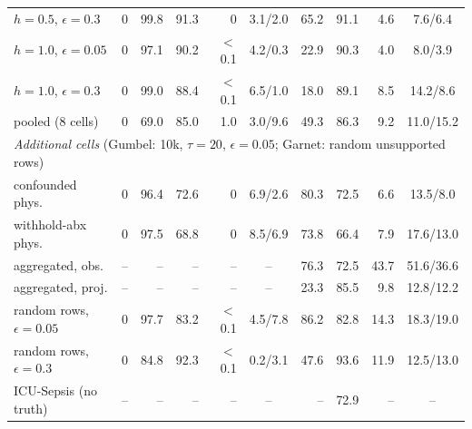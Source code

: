 \begin{tabular}{lrrrrcrrrc}
$h{=}0.5$, $\epsilon{=}0.3$ & 0 & 99.8 & 91.3 & 0 & 3.1/2.0 & 65.2 & 91.1 & 4.6 & 7.6/6.4 \\
$h{=}1.0$, $\epsilon{=}0.05$ & 0 & 97.1 & 90.2 & $<$0.1 & 4.2/0.3 & 22.9 & 90.3 & 4.0 & 8.0/3.9 \\
$h{=}1.0$, $\epsilon{=}0.3$ & 0 & 99.0 & 88.4 & $<$0.1 & 6.5/1.0 & 18.0 & 89.1 & 8.5 & 14.2/8.6 \\
pooled (8 cells) & 0 & 69.0 & 85.0 & 1.0 & 3.0/9.6 & 49.3 & 86.3 & 9.2 & 11.0/15.2 \\
\midrule
\multicolumn{10}{l}{\textit{Additional cells} (Gumbel: 10k, $\tau{=}20$, $\epsilon{=}0.05$; Garnet: random unsupported rows)} \\
confounded phys. & 0 & 96.4 & 72.6 & 0 & 6.9/2.6 & 80.3 & 72.5 & 6.6 & 13.5/8.0 \\
withhold-abx phys. & 0 & 97.5 & 68.8 & 0 & 8.5/6.9 & 73.8 & 66.4 & 7.9 & 17.6/13.0 \\
aggregated, obs. & -- & -- & -- & -- & -- & 76.3 & 72.5 & 43.7 & 51.6/36.6 \\
aggregated, proj. & -- & -- & -- & -- & -- & 23.3 & 85.5 & 9.8 & 12.8/12.2 \\
random rows, $\epsilon{=}0.05$ & 0 & 97.7 & 83.2 & $<$0.1 & 4.5/7.8 & 86.2 & 82.8 & 14.3 & 18.3/19.0 \\
random rows, $\epsilon{=}0.3$ & 0 & 84.8 & 92.3 & $<$0.1 & 0.2/3.1 & 47.6 & 93.6 & 11.9 & 12.5/13.0 \\
\midrule
ICU-Sepsis (no truth) & -- & -- & -- & -- & -- & -- & 72.9 & -- & -- \\
\bottomrule
\end{tabular}
